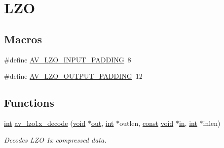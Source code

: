 \hypertarget{group__lavu__lzo}{}\section{L\+ZO}
\label{group__lavu__lzo}
\subsection*{Macros}
\begin{DoxyCompactItemize}
\item 
\#define \hyperlink{group__lavu__lzo_ga396ab17a8ae4cd3cef02747796f5f8f7}{A\+V\+\_\+\+L\+Z\+O\+\_\+\+I\+N\+P\+U\+T\+\_\+\+P\+A\+D\+D\+I\+NG}~8
\item 
\#define \hyperlink{group__lavu__lzo_gaece7adef189377f4ab7da464247a9e85}{A\+V\+\_\+\+L\+Z\+O\+\_\+\+O\+U\+T\+P\+U\+T\+\_\+\+P\+A\+D\+D\+I\+NG}~12
\end{DoxyCompactItemize}
\subsection*{Functions}
\begin{DoxyCompactItemize}
\item 
\hyperlink{xmltok_8h_a5a0d4a5641ce434f1d23533f2b2e6653}{int} \hyperlink{group__lavu__lzo_gaafb2f88aa03d1fe059f3c2e174df6142}{av\+\_\+lzo1x\+\_\+decode} (\hyperlink{sound_8c_ae35f5844602719cf66324f4de2a658b3}{void} $\ast$\hyperlink{latency_8c_a71fd1c281affec034757279e4f91c50b}{out}, \hyperlink{xmltok_8h_a5a0d4a5641ce434f1d23533f2b2e6653}{int} $\ast$outlen, \hyperlink{getopt1_8c_a2c212835823e3c54a8ab6d95c652660e}{const} \hyperlink{sound_8c_ae35f5844602719cf66324f4de2a658b3}{void} $\ast$\hyperlink{latency_8c_a7d946209d777cb95fe30364b8d321207}{in}, \hyperlink{xmltok_8h_a5a0d4a5641ce434f1d23533f2b2e6653}{int} $\ast$inlen)
\begin{DoxyCompactList}\small\item\em Decodes L\+ZO 1x compressed data. \end{DoxyCompactList}\end{DoxyCompactItemize}
